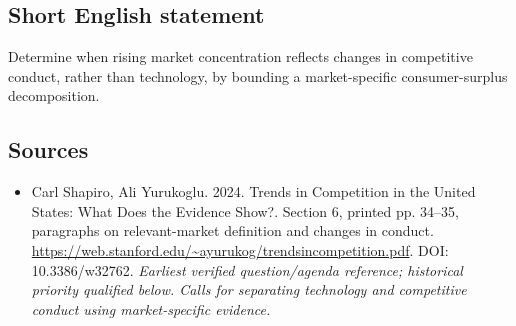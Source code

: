 \documentclass[11pt]{article}
\begin{document}
\subsection{Short English statement}
Determine when rising market concentration reflects changes in competitive conduct, rather than technology, by bounding a market-specific consumer-surplus decomposition.

\subsection{Sources}
\begin{itemize}\raggedright
\item[\textnormal{[S1]}]\hypertarget{source:30007672:1}{} Carl Shapiro, Ali Yurukoglu. 2024. Trends in Competition in the United States: What Does the Evidence Show?. Section 6, printed pp. 34–35, paragraphs on relevant-market definition and changes in conduct.
\url{https://web.stanford.edu/~ayurukog/trendsincompetition.pdf}.
DOI: 10.3386/w32762.
{\small\textit{Earliest verified question/agenda reference; historical priority qualified below. Calls for separating technology and competitive conduct using market-specific evidence.}}
\end{itemize}
\end{document}
